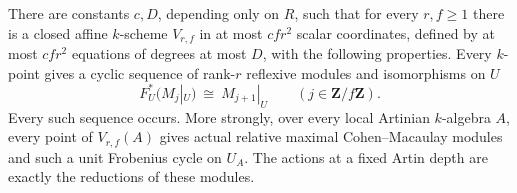 \begin{lemma}
\label{D:quadratic-cyclic-Frobenius-witnesses}
There are constants \(c,D\), depending only on \(R\), such that for
every \(r,f\geq1\) there is a closed affine \(k\)-scheme \(V_{r,f}\)
in at most \(cfr^2\) scalar coordinates, defined by at most \(cfr^2\)
equations of degrees at most \(D\), with the following properties.
Every \(k\)-point gives a cyclic sequence of rank-\(r\) reflexive modules
and isomorphisms on \(U\)
\[
 F_U^*(M_j|_U)\ \cong\ M_{j+1}|_U
 \qquad(j\in\mathbf Z/f\mathbf Z).
 \tag{L2}
\]
Every such sequence occurs. More strongly, over every local Artinian
\(k\)-algebra \(A\), every point of \(V_{r,f}(A)\) gives actual
relative maximal Cohen--Macaulay modules and such a unit Frobenius
cycle on \(U_A\). The actions at a fixed Artin depth are exactly the
reductions of these modules.
\end{lemma}

